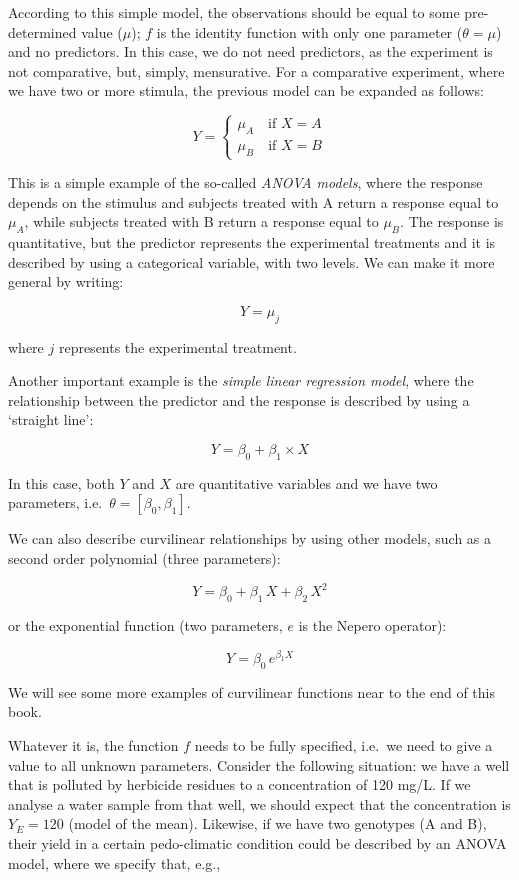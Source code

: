 \documentclass[a4paper,12pt,oneside]{book}
\begin{document}
According to this simple model, the observations should be equal to some pre-determined value (\(\mu\)); \(f\) is the identity function with only one parameter (\(\theta = \mu\)) and no predictors. In this case, we do not need predictors, as the experiment is not comparative, but, simply, mensurative. For a comparative experiment, where we have two or more stimula, the previous model can be expanded as follows:

\vspace{12pt}

\[
Y = \left\{ {\begin{array}{ll}
\mu_A \quad \textrm{if} \,\, X = A \\
\mu_B \quad \textrm{if} \,\, X = B
\end{array}} \right.
\]

This is a simple example of the so-called \emph{ANOVA models}, where the response depends on the stimulus and subjects treated with A return a response equal to \(\mu_A\), while subjects treated with B return a response equal to \(\mu_B\). The response is quantitative, but the predictor represents the experimental treatments and it is described by using a categorical variable, with two levels. We can make it more general by writing:

\[Y = \mu_j\]

where \(j\) represents the experimental treatment.

Another important example is the \emph{simple linear regression model}, where the relationship between the predictor and the response is described by using a `straight line':

\[ Y = \beta_0 + \beta_1 \times X \]

In this case, both \(Y\) and \(X\) are quantitative variables and we have two parameters, i.e.~\(\theta = [\beta_0, \beta_1]\).

We can also describe curvilinear relationships by using other models, such as a second order polynomial (three parameters):

\[ Y = \beta_0 + \beta_1 \, X + \beta_2 \, X^2\]

or the exponential function (two parameters, \(e\) is the Nepero operator):

\[ Y = \beta_0 \, e^{\beta_1 X} \]

We will see some more examples of curvilinear functions near to the end of this book.

Whatever it is, the function \(f\) needs to be fully specified, i.e.~we need to give a value to all unknown parameters. Consider the following situation: we have a well that is polluted by herbicide residues to a concentration of 120 mg/L. If we analyse a water sample from that well, we should expect that the concentration is \(Y_E = 120\) (model of the mean). Likewise, if we have two genotypes (A and B), their yield in a certain pedo-climatic condition could be described by an ANOVA model, where we specify that, e.g.,
\end{document}
